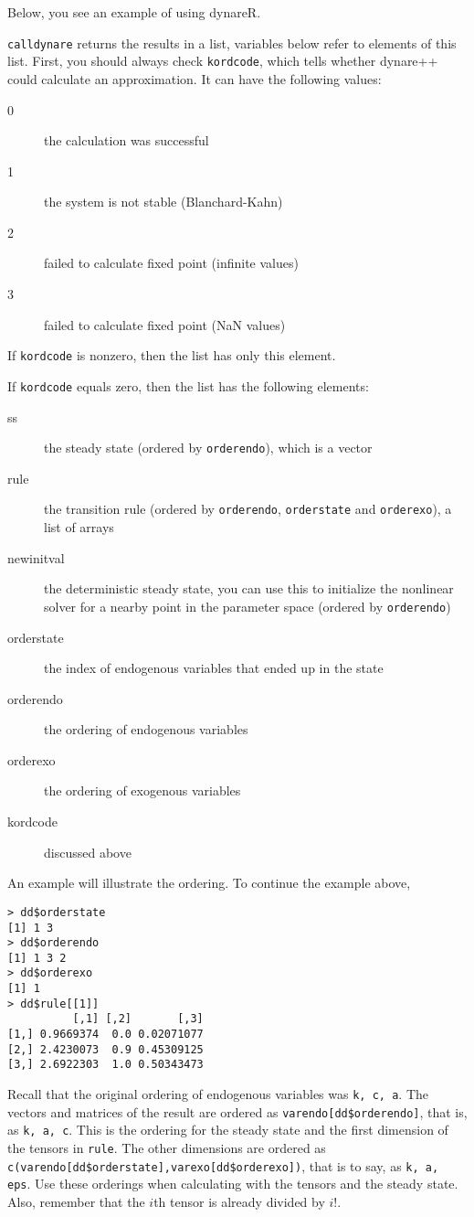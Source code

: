 \documentclass[12pt,a4paper]{article}
\begin{document}
Below, you see an example of using dynareR.


\lstinline{calldynare} returns the results in a list, variables below
refer to elements of this list.  First, you should always check
\lstinline{kordcode}, which tells whether dynare++ could calculate an
approximation.  It can have the following values:
\begin{description}
\item[0] the calculation was successful
\item[1] the system is not stable (Blanchard-Kahn)
\item[2] failed to calculate fixed point (infinite values)
\item[3] failed to calculate fixed point (NaN values)
\end{description}
If \lstinline{kordcode} is nonzero, then the list has only this
element.

If \lstinline{kordcode} equals zero, then the list has the following
elements:
\begin{description}
\item[ss] the steady state (ordered by \lstinline{orderendo}), which
  is a vector
\item[rule] the transition rule (ordered by \lstinline{orderendo},
  \lstinline{orderstate} and \lstinline{orderexo}), a list of arrays
\item[newinitval] the deterministic steady state, you can use this to
  initialize the nonlinear solver for a nearby point in the parameter
  space (ordered by \lstinline{orderendo})
\item[orderstate] the index of endogenous variables that ended up in
  the state
\item[orderendo] the ordering of endogenous variables
\item[orderexo] the ordering of exogenous variables
\item[kordcode] discussed above
\end{description}

An example will illustrate the ordering.  To continue the example above,
\begin{lstlisting}
> dd$orderstate
[1] 1 3
> dd$orderendo
[1] 1 3 2
> dd$orderexo
[1] 1
> dd$rule[[1]]
          [,1] [,2]       [,3]
[1,] 0.9669374  0.0 0.02071077
[2,] 2.4230073  0.9 0.45309125
[3,] 2.6922303  1.0 0.50343473
\end{lstlisting}
Recall that the original ordering of endogenous variables was
\lstinline{k, c, a}.  The vectors and matrices of the result are
ordered as \lstinline{varendo[dd$orderendo]}, that is, as
\lstinline{k, a, c}.  This is the ordering for the steady state and
the first dimension of the tensors in \lstinline{rule}.  The other
dimensions are ordered as
\lstinline{c(varendo[dd$orderstate],varexo[dd$orderexo])}, that is to
say, as \lstinline{k, a, eps}.  Use these orderings when calculating
with the tensors and the steady state.  Also, remember that the $i$th
tensor is already divided by $i!$.
\end{document}
